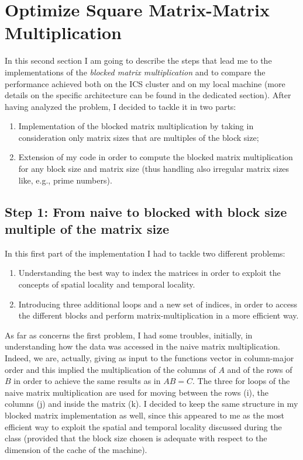 \documentclass[unicode,11pt,a4paper,oneside,numbers=endperiod,openany]{scrartcl}
\begin{document}
\section{Optimize Square Matrix-Matrix Multiplication  }
In this second section I am going to describe the steps that lead me to the implementations of the \textit{blocked matrix multiplication} and to compare the performance achieved both on the ICS cluster and on my local machine (more details on the specific architecture can be found in the dedicated section). After having analyzed the problem, I decided to tackle it in two parts:
\begin{enumerate}
	\item Implementation of the blocked matrix multiplication by taking in consideration only matrix sizes that are multiples of the block size;
	\item Extension of my code in order to compute the blocked matrix multiplication for any block size and matrix size (thus handling also irregular matrix sizes like, e.g., prime numbers).
\end{enumerate}
 

\subsection{Step 1: From naive to blocked with block size multiple of the matrix size}
In this first part of the implementation I had to tackle two different problems:
\begin{enumerate}
	\item Understanding the best way to index the matrices in order to exploit the concepts of spatial locality and temporal locality.
	\item Introducing three additional loops and a new set of indices, in order to access the different blocks and perform matrix-multiplication in a more efficient way.
\end{enumerate}
As far as concerns the first problem, I had some troubles, initially, in understanding how the data was accessed in the naive matrix multiplication. Indeed, we are, actually, giving as input to the functions vector in column-major order and this implied the multiplication of the columns of $A$ and of the rows of $B$ in order to achieve the same results as in $AB=C$. The three for loops of the naive matrix multiplication are used for moving between the rows (i), the columns (j) and inside the matrix (k). I decided to keep the same structure in my blocked matrix implementation as well, since this appeared to me as the most efficient way to exploit the spatial and temporal locality discussed during the class (provided that the block size chosen is adequate with respect to the dimension of the cache of the machine).
\end{document}
